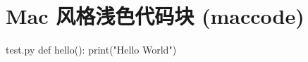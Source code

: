 \section{Mac 风格浅色代码块 (maccode)}

\begin{maccode}[Python]{test.py}
def hello():
    print("Hello World")
\end{maccode}
